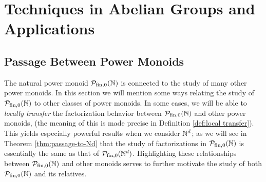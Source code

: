 
\chapter{Techniques in Abelian Groups and Applications} \label{ch:applications}
\section{Passage Between Power Monoids}\label{sec:passage}


The natural power monoid ${\mathcal{P}_{\textrm{fin},0}(\mathbb{N})}$ is connected to the study of many other power monoids.
In this section we will mention some ways relating the study of ${\mathcal{P}_{\textrm{fin},0}(\mathbb{N})}$ to other classes of power monoids.
In some cases, we will be able to \textit{locally transfer} the factorization behavior between ${\mathcal{P}_{\textrm{fin},0}(\mathbb{N})}$ and other power monoids, (the meaning of this is made precise in Definition \ref{def:local transfer}).
This yields especially powerful results when we consider $\mathbb{N}^d$; as we will see in Theorem \ref{thm:passage-to-Nd} that the study of factorizations in ${\mathcal{P}_{\textrm{fin},0}(\mathbb{N})}$ is essentially the same as that of $\mathcal{P}_{\textrm{fin}, 0}(\mathbb{N}^d)$.
Highlighting these relationships between ${\mathcal{P}_{\textrm{fin},0}(\mathbb{N})}$ and other monoids serves to further motivate the study of both ${\mathcal{P}_{\textrm{fin},0}(\mathbb{N})}$ and its relatives.







